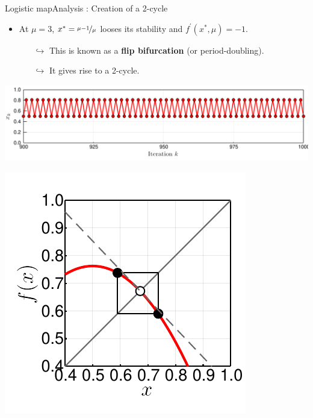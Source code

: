 \documentclass[usenames,dvipsnames,svgnames,10pt,aspectratio=169]{beamer}
\begin{document}
\begin{frame}[t, c]{Logistic map}{Analysis : Creation of a 2-cycle}
	\begin{minipage}{.68\textwidth}
		\begin{itemize}
			\item At \( \mu = 3\), \( x^* = \nicefrac{\mu-1}{\mu} \) looses its stability and \( f^{\prime}(x^*, \mu) = -1\).
			\begin{itemize}
				\item[\( \hookrightarrow \)] This is known as a \textbf{flip bifurcation} (or period-doubling).
				\item[\( \hookrightarrow \)] It gives rise to a 2-cycle.
			\end{itemize}
		\end{itemize}

		\medskip

		\includegraphics[width=\textwidth]{cycle_2_time_series}
	\end{minipage}%
	\hfill
	\begin{minipage}{.28\textwidth}
		\centering
		\includegraphics[width=\textwidth]{flip_bifurcation}
	\end{minipage}

	\vspace{1cm}
\end{frame}
\end{document}
